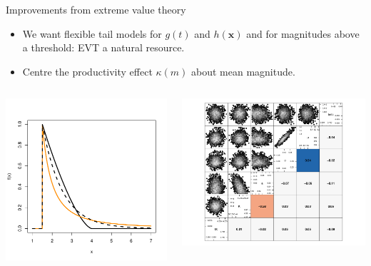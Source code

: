 \documentclass[10pt]{beamer}
\begin{document}
\begin{frame}{\hfill Improvements from extreme value theory}
    \begin{itemize}
        \item We want flexible tail models for $g(t)$ and $h(\bm{x})$ and for magnitudes above a threshold: EVT a natural resource. 
        \item Centre the productivity effect $\kappa(m)$ about mean magnitude.
    \end{itemize}
   \begin{columns}
    \begin{column}{0.33\textwidth}
    \includegraphics[width = \textwidth]{Images/GPD_examples.pdf}
    \end{column}
    \begin{column}{0.33\textwidth}
    \includegraphics[width = \textwidth]{Images/ETASpars.pdf}

\end{column}
\end{columns}
\end{frame}
\end{document}
